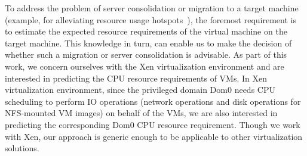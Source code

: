 


To address the problem of server consolidation or migration to
a target machine (example, for alleviating resource usage 
hotspots~\cite{sandpiper}),
the foremost requirement is to estimate the expected resource
requirements of the virtual machine on the target machine. This
knowledge in turn, can enable us to make the decision of whether
such a migration or server consolidation is advisable.
As part of this work,
we concern ourselves with the Xen virtualization environment
and are interested in predicting the CPU resource requirements
of VMs. In Xen virtualization environment, since the privileged
domain Dom0 needs CPU scheduling to perform IO operations
(network operations and disk operations for NFS-mounted
VM images) on behalf of the VMs, we are also interested in predicting the
corresponding Dom0 CPU resource requirement.
Though we work with Xen, our approach is generic enough
to be applicable to other virtualization solutions.

